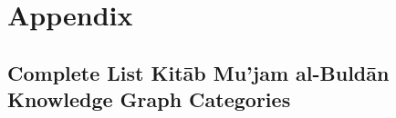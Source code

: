 \chapter{Appendix}\label{ch:appendix}

\section{Complete List Kitāb Mu'jam al-Buldān Knowledge Graph Categories}\label{sec:appx-categories}

